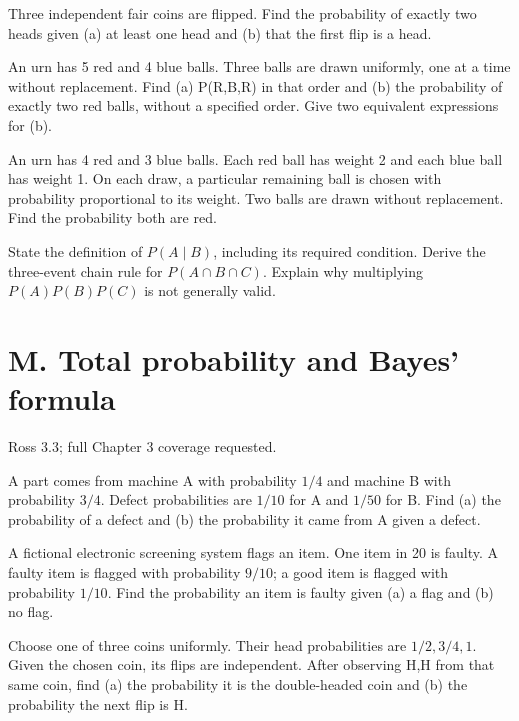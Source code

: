 \documentclass[11pt]{article}
\newcommand{\qid}[1]{\par\needspace{5\baselineskip}\noindent{\color{accent}\bfseries #1}\quad}
\newcommand{\source}[1]{{\small\color{muted}#1}\par}
\begin{document}
\qid{L2} Three independent fair coins are flipped. Find the probability of exactly two heads given (a) at least one head and (b) that the first flip is a head.
\par\vspace{0.40in}

\qid{L3} An urn has 5 red and 4 blue balls. Three balls are drawn uniformly, one at a time without replacement. Find (a) P(R,B,R) in that order and (b) the probability of exactly two red balls, without a specified order. Give two equivalent expressions for (b).
\par\vspace{0.40in}

\qid{L4} An urn has 4 red and 3 blue balls. Each red ball has weight 2 and each blue ball has weight 1. On each draw, a particular remaining ball is chosen with probability proportional to its weight. Two balls are drawn without replacement. Find the probability both are red.
\par\vspace{0.40in}

\qid{L5} State the definition of \(P(A\mid B)\), including its required condition. Derive the three-event chain rule for \(P(A\cap B\cap C)\). Explain why multiplying \(P(A)P(B)P(C)\) is not generally valid.
\par\vspace{0.40in}


\clearpage
\section*{M. Total probability and Bayes' formula}
\source{Ross 3.3; full Chapter 3 coverage requested.}
\qid{M1} A part comes from machine A with probability \(1/4\) and machine B with probability \(3/4\). Defect probabilities are \(1/10\) for A and \(1/50\) for B. Find (a) the probability of a defect and (b) the probability it came from A given a defect.
\par\vspace{0.40in}

\qid{M2} A fictional electronic screening system flags an item. One item in 20 is faulty. A faulty item is flagged with probability \(9/10\); a good item is flagged with probability \(1/10\). Find the probability an item is faulty given (a) a flag and (b) no flag.
\par\vspace{0.40in}

\qid{M3} Choose one of three coins uniformly. Their head probabilities are \(1/2,3/4,1\). Given the chosen coin, its flips are independent. After observing H,H from that same coin, find (a) the probability it is the double-headed coin and (b) the probability the next flip is H.
\par\vspace{0.40in}
\end{document}
